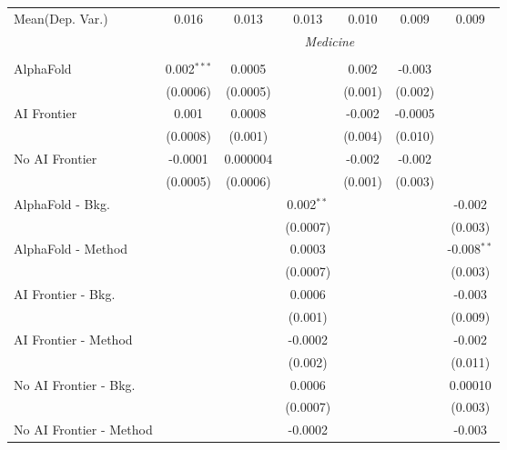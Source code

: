 \begin{tabular}{lcccccc}
Mean(Dep. Var.) & 0.016 & 0.013 & 0.013 & 0.010 & 0.009 & 0.009 \\
 & \multicolumn{6}{c}{\textit{Medicine}} \\ \\
   AlphaFold               & 0.002$^{***}$ & 0.0005   &              & 0.002   & -0.003  &   \\   
                           & (0.0006)      & (0.0005) &              & (0.001) & (0.002) &   \\   
   AI Frontier             & 0.001         & 0.0008   &              & -0.002  & -0.0005 &   \\   
                           & (0.0008)      & (0.001)  &              & (0.004) & (0.010) &   \\   
   No AI Frontier          & -0.0001       & 0.000004 &              & -0.002  & -0.002  &   \\   
                           & (0.0005)      & (0.0006) &              & (0.001) & (0.003) &   \\   
   AlphaFold - Bkg.        &               &          & 0.002$^{**}$ &         &         & -0.002\\   
                           &               &          & (0.0007)     &         &         & (0.003)\\   
   AlphaFold - Method      &               &          & 0.0003       &         &         & -0.008$^{**}$\\   
                           &               &          & (0.0007)     &         &         & (0.003)\\   
   AI Frontier - Bkg.      &               &          & 0.0006       &         &         & -0.003\\   
                           &               &          & (0.001)      &         &         & (0.009)\\   
   AI Frontier - Method    &               &          & -0.0002      &         &         & -0.002\\   
                           &               &          & (0.002)      &         &         & (0.011)\\   
   No AI Frontier - Bkg.   &               &          & 0.0006       &         &         & 0.00010\\   
                           &               &          & (0.0007)     &         &         & (0.003)\\   
   No AI Frontier - Method &               &          & -0.0002      &         &         & -0.003\\   

\end{tabular}
